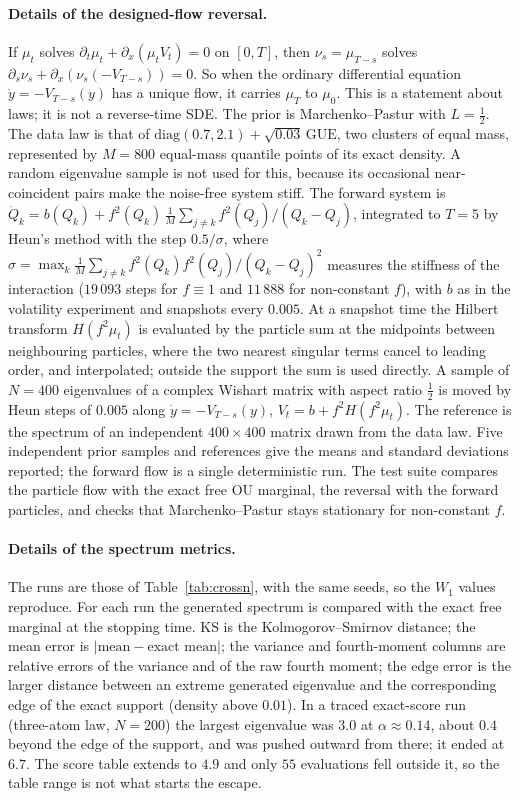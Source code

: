 \documentclass[11pt]{article}
\theoremstyle{plain}
\theoremstyle{definition}
\theoremstyle{remark}
\begin{document}
\paragraph{Details of the designed-flow reversal.} If $\mu_t$ solves $\partial_t\mu_t+\partial_x(\mu_tV_t)=0$ on $[0,T]$, then
$\nu_s=\mu_{T-s}$ solves $\partial_s\nu_s+\partial_x(\nu_s(-V_{T-s}))=0$. So when the ordinary differential equation
$\dot y=-V_{T-s}(y)$ has a unique flow, it carries $\mu_T$ to $\mu_0$. This is a statement about laws; it is not a reverse-time SDE.
The prior is Marchenko--Pastur with $L=\tfrac12$. The data law is that of $\mathrm{diag}(0.7,2.1)+\sqrt{0.03}\,\mathrm{GUE}$, two clusters of
equal mass, represented by $M=800$ equal-mass quantile points of its exact density. A random eigenvalue sample is not used for this,
because its occasional near-coincident pairs make the noise-free system stiff. The forward system is
$\dot Q_k=b(Q_k)+f^2(Q_k)\,\tfrac1M\sum_{j\ne k}f^2(Q_j)/(Q_k-Q_j)$, integrated to $T=5$ by Heun's method with the step $0.5/\sigma$,
where $\sigma=\max_k\tfrac1M\sum_{j\ne k}f^2(Q_k)f^2(Q_j)/(Q_k-Q_j)^2$ measures the stiffness of the interaction ($19\,093$ steps for
$f\equiv1$ and $11\,888$ for non-constant $f$), with $b$ as in the volatility experiment and snapshots every $0.005$. At a snapshot time
the Hilbert transform $H(f^2\mu_t)$ is evaluated by the particle sum at the midpoints between neighbouring particles, where the two nearest
singular terms cancel to leading order, and interpolated; outside the support the sum is used directly. A sample of $N=400$ eigenvalues of a
complex Wishart matrix with aspect ratio $\tfrac12$ is moved by Heun steps of $0.005$ along $\dot y=-V_{T-s}(y)$, $V_t=b+f^2H(f^2\mu_t)$. The
reference is the spectrum of an independent $400\times400$ matrix drawn from the data law. Five independent prior samples and references
give the means and standard deviations reported; the forward flow is a single deterministic run. The test suite compares the particle flow
with the exact free OU marginal, the reversal with the forward particles, and checks that Marchenko--Pastur stays stationary for
non-constant $f$.

\paragraph{Details of the spectrum metrics.} The runs are those of Table~\ref{tab:crossn}, with the same seeds, so the $W_1$ values reproduce. For each run the generated
spectrum is compared with the exact free marginal at the stopping time. KS is the Kolmogorov--Smirnov distance; the mean error is $|\text{mean}-\text{exact mean}|$; the
variance and fourth-moment columns are relative errors of the variance and of the raw fourth moment; the edge error is the larger distance between an extreme generated
eigenvalue and the corresponding edge of the exact support (density above $0.01$). In a traced exact-score run (three-atom law, $N=200$) the largest eigenvalue was $3.0$ at
$\alpha\approx0.14$, about $0.4$ beyond the edge of the support, and was pushed outward from there; it ended at $6.7$. The score table extends to $4.9$ and only $55$ evaluations fell
outside it, so the table range is not what starts the escape.
\end{document}
